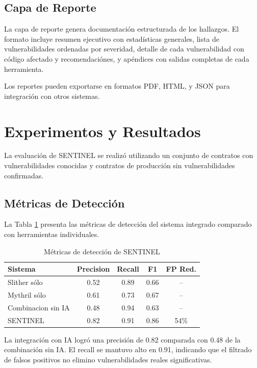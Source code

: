 \documentclass[12pt,a4paper,twoside]{book}
\begin{document}
\subsection{Capa de Reporte}

La capa de reporte genera documentación estructurada de los hallazgos. El formato incluye resumen ejecutivo con estadísticas generales, lista de vulnerabilidades ordenadas por severidad, detalle de cada vulnerabilidad con código afectado y recomendaciónes, y apéndices con salidas completas de cada herramienta.

Los reportes pueden exportarse en formatos PDF, HTML, y JSON para integración con otros sistemas.

\section{Experimentos y Resultados}

La evaluación de SENTINEL se realizó utilizando un conjunto de contratos con vulnerabilidades conocidas y contratos de producción sin vulnerabilidades confirmadas.

\subsection{Métricas de Detección}

La Tabla \ref{tab:sentinel_métricas} presenta las métricas de detección del sistema integrado comparado con herramientas individuales.

\begin{table}[h]
\centering
\caption{Métricas de detección de SENTINEL}
\label{tab:sentinel_métricas}
\begin{tabular}{lcccc}
\toprule
\textbf{Sistema} & \textbf{Precision} & \textbf{Recall} & \textbf{F1} & \textbf{FP Red.} \\
\midrule
Slither sólo & 0.52 & 0.89 & 0.66 & -- \\
Mythril sólo & 0.61 & 0.73 & 0.67 & -- \\
Combinacion sin IA & 0.48 & 0.94 & 0.63 & -- \\
SENTINEL & 0.82 & 0.91 & 0.86 & 54\% \\
\bottomrule
\end{tabular}
\end{table}

La integración con IA logró una precisión de 0.82 comparada con 0.48 de la combinación sin IA. El recall se mantuvo alto en 0.91, indicando que el filtrado de falsos positivos no elimino vulnerabilidades reales significativas.
\end{document}
